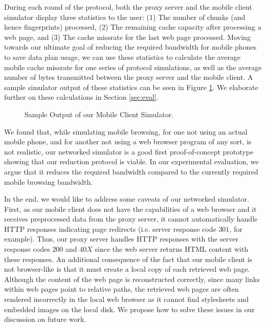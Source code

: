 During each round of the protocol, both the proxy server and the mobile client simulator display three statistics to the user: (1) The number of chunks (and hence fingerprints) processed, (2) The remaining cache capacity after processing a web page, and (3) The cache missrate for the last web page processed. Moving towards our ultimate goal of reducing the required bandwidth for mobile phones to save data plan usage, we can use these statistics to calculate the average mobile cache missrate for one series of protocol simulations, as well as the average number of bytes transmitted between the proxy server and the mobile client. A sample simulator output of these statistics can be seen in Figure \ref{fig:mobsim_output}. We elaborate further on these calculations in Section \ref{sec:eval}.

\begin{figure}[h] 
\caption{Sample Output of our Mobile Client Simulator.}
\label{fig:mobsim_output}
\end{figure}

We found that, while simulating mobile browsing, for one not using an actual mobile phone, and for another not using a web browser program of any sort, is not realistic, our networked simulator is a good first proof-of-concept prototype showing that our reduction protocol is viable. In our experimental evaluation, we argue that it reduces the required bandwidth compared to the currently required mobile browsing bandwidth.

In the end, we would like to address some caveats of our networked simulator. First, as our mobile client does not have the capabilities of a web browser and it receives preprocessed data from the proxy server, it cannot automatically handle HTTP responses indicating page redirects (i.e. server response code $301$, for example). Thus, our proxy server handles HTTP responses with the server response codes $200$ and $40X$ since the web server returns HTML content with these responses. An additional consequence of the fact that our mobile client is not browser-like is that it must create a local copy of each retrieved web page. Although the content of the web page is reconstructed correctly, since many links within web pages point to relative paths, the retrieved web pages are often rendered incorrectly in the local web browser as it cannot find stylesheets and embedded images on the local disk. We propose how to solve these issues in our discussion on future work.
